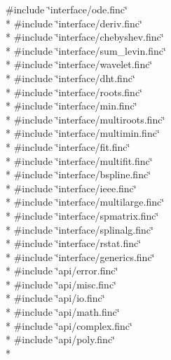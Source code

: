 {\ttfamily \#include \char`\"{}interface/ode.\+finc\char`\"{}}\\*
{\ttfamily \#include \char`\"{}interface/deriv.\+finc\char`\"{}}\\*
{\ttfamily \#include \char`\"{}interface/chebyshev.\+finc\char`\"{}}\\*
{\ttfamily \#include \char`\"{}interface/sum\+\_\+levin.\+finc\char`\"{}}\\*
{\ttfamily \#include \char`\"{}interface/wavelet.\+finc\char`\"{}}\\*
{\ttfamily \#include \char`\"{}interface/dht.\+finc\char`\"{}}\\*
{\ttfamily \#include \char`\"{}interface/roots.\+finc\char`\"{}}\\*
{\ttfamily \#include \char`\"{}interface/min.\+finc\char`\"{}}\\*
{\ttfamily \#include \char`\"{}interface/multiroots.\+finc\char`\"{}}\\*
{\ttfamily \#include \char`\"{}interface/multimin.\+finc\char`\"{}}\\*
{\ttfamily \#include \char`\"{}interface/fit.\+finc\char`\"{}}\\*
{\ttfamily \#include \char`\"{}interface/multifit.\+finc\char`\"{}}\\*
{\ttfamily \#include \char`\"{}interface/bspline.\+finc\char`\"{}}\\*
{\ttfamily \#include \char`\"{}interface/ieee.\+finc\char`\"{}}\\*
{\ttfamily \#include \char`\"{}interface/multilarge.\+finc\char`\"{}}\\*
{\ttfamily \#include \char`\"{}interface/spmatrix.\+finc\char`\"{}}\\*
{\ttfamily \#include \char`\"{}interface/splinalg.\+finc\char`\"{}}\\*
{\ttfamily \#include \char`\"{}interface/rstat.\+finc\char`\"{}}\\*
{\ttfamily \#include \char`\"{}interface/generics.\+finc\char`\"{}}\\*
{\ttfamily \#include \char`\"{}api/error.\+finc\char`\"{}}\\*
{\ttfamily \#include \char`\"{}api/misc.\+finc\char`\"{}}\\*
{\ttfamily \#include \char`\"{}api/io.\+finc\char`\"{}}\\*
{\ttfamily \#include \char`\"{}api/math.\+finc\char`\"{}}\\*
{\ttfamily \#include \char`\"{}api/complex.\+finc\char`\"{}}\\*
{\ttfamily \#include \char`\"{}api/poly.\+finc\char`\"{}}\\*
